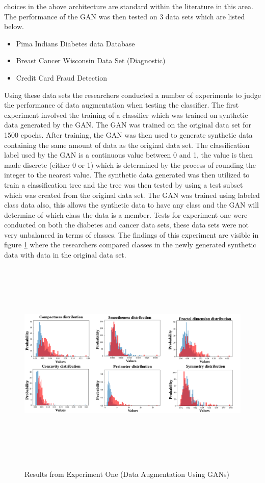 choices in the above architecture are standard within the literature in this area.  The performance of the GAN was then tested on 3 data sets which are listed below.
\begin{itemize}
    \item Pima Indians Diabetes data Database
    \item Breast Cancer Wisconsin Data Set (Diagnostic)
    \item Credit Card Fraud Detection
\end{itemize}
Using these data sets the researchers conducted a number of experiments to judge the performance of data augmentation when testing the classifier.  The first experiment involved the training of a classifier which was trained on synthetic data generated by the GAN.  The GAN was trained on the original data set for 1500 epochs. After training, the GAN was then used to generate synthetic data  containing the same amount of data as the original data set.  The classification label used by the GAN is a continuous value between 0 and 1, the value is then made discrete (either 0 or 1) which is determined by the process of rounding the integer to the nearest value.  The synthetic data generated was then utilized to train a classification tree and the tree was then tested by using a test subset which was created from the original data set. The GAN was trained using labeled class data also,  this allows the synthetic data to have any class and the GAN will determine of which class the data is a member.  Tests for experiment one were conducted on both the diabetes and cancer data sets, these data sets were not very unbalanced in terms of classes.  The findings of this experiment are visible in figure \ref{fig:Results from Experiment One(Data Augmentation Using GANs)} where the researchers compared classes in the newly generated synthetic data with data in the original data set.
\vspace{0.5mm}
 \begin{figure}[H]
    \centering
    \includegraphics[width=1\textwidth,height=10cm,keepaspectratio]{Images/Experiment1GanDataAugmentation.png}\\
    \caption{Results from Experiment One (Data Augmentation Using GANs)\cite{litReviewGanDataAugmentation}}
    \label{fig:Results from Experiment One(Data Augmentation Using GANs)}
\end{figure}
